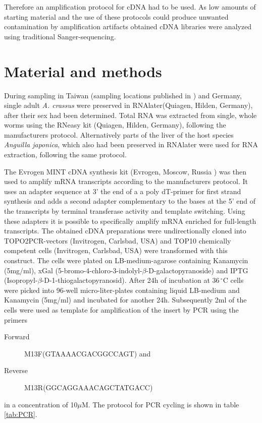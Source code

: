 \documentclass[12pt,a4paper]{article}
\begin{document}
Therefore an amplification protocol for cDNA had to be used.  As low
amounts of starting material and the use of these protocols could
produce unwanted contamination by amplification artifacts obtained
cDNA libraries were analyzed using traditional Sanger-sequencing.

\section*{Material and methods}

During sampling in Taiwan (sampling locations published in
\cite{heitlinger_massive_2009}) and Germany, single adult
\textit{A. crassus} were preserved in RNAlater(Quiagen, Hilden,
Germany), after their sex had been determined. Total RNA was extracted
from single, whole worms using the RNeasy kit (Quiagen, Hilden,
Germany), following the manufacturers protocol. Alternatively parts of
the liver of the host species \textit{Anguilla japonica}, which also
had been preserved in RNAlater were used for RNA extraction, following
the same protocol.

The Evrogen MINT cDNA synthesis kit (Evrogen, Moscow, Russia ) was
then used to amplify mRNA transcripts according to the manufacturers
protocol. It uses an adapter sequence at 3' the end of a a poly
dT-primer for first strand synthesis and adds a second adapter
complementary to the bases at the 5' end of the transcripts by
terminal transferase activity and template switching. Using these
adapters it is possible to specifically amplify mRNA enriched for
full-length transcripts. The obtained cDNA preparations were
undirectionally cloned into TOPO2PCR-vectors (Invitrogen, Carlsbad,
USA) and TOP10 chemically competent cells (Invitrogen, Carlsbad, USA)
were transformed with this construct. The cells were plated on
LB-medium-agarose containing Kanamycin (5mg/ml), xGal
(5-bromo-4-chloro-3-indolyl-$\beta$-D-galactopyranoside) and IPTG
(Isopropyl-$\beta$-D-1-thiogalactopyranosid). After 24h of incubation
at $36\,^{\circ}\mathrm{C} $ cells were picked into 96-well
micro-liter-plates containing liquid LB-medium and Kanamycin (5mg/ml)
and incubated for another 24h. Subsequently 2ml of the cells were used
as template for amplification of the insert by PCR using the primers
\begin{description}
\item[Forward] M13F(GTAAAACGACGGCCAGT) and
\item[Reverse] M13R(GGCAGGAAACAGCTATGACC)
\end{description}
in a concentration of 10$\mu$M. The protocol for PCR cycling is shown
in table \ref{tab:PCR}.
\end{document}
